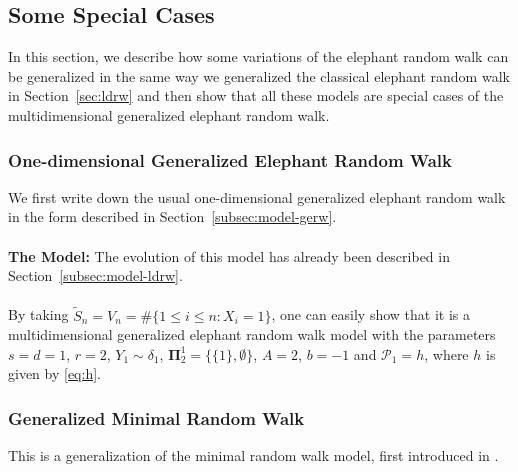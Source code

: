 \documentclass[12pt]{amsart}
\theoremstyle{plain}
\theoremstyle{remark}
\numberwithin{equation}{section}
\begin{document}
\subsection{Some Special Cases}\label{subsec:special-cases}

In this section, we describe how some variations of the
elephant random walk can be generalized in the same way we generalized the classical elephant random walk in Section~\ref{sec:ldrw} and then show that all these models are special cases of the multidimensional generalized elephant random walk.

\subsubsection{One-dimensional Generalized Elephant Random Walk}\label{eg:ldrw}

We first write down the usual one-dimensional generalized elephant random walk in the form described in Section~\ref{subsec:model-gerw}.
\hfill \\\\
\textbf{The Model:} The evolution of this model has already been described in Section~\ref{subsec:model-ldrw}. \\\\
By taking $\widetilde{S}_n = V_n = \#\{1 \leq i \leq n : X_i = 1\}$, one can easily show that it is a multidimensional generalized elephant random walk model with the parameters $s = d = 1$, $r = 2$, ${Y}_1 \sim \delta_{{1}}$, $\boldsymbol{\Pi}^1_2 = \{\{1\},\emptyset\}$, ${A} = 2$, ${b} = -1$ and ${\mathcal{P}_1} = h$, where $h$ is given by \eqref{eq:h}.

\subsubsection{Generalized Minimal Random Walk}\label{eg:gmrw}

This is a generalization of the minimal random walk model, first introduced in \cite{harbola2014memory}. 
\end{document}
